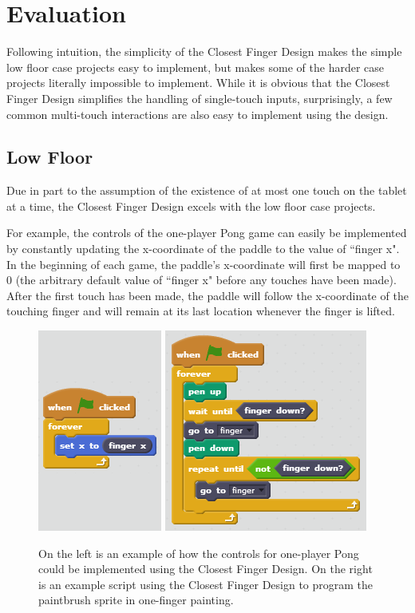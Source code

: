 \section{Evaluation}
Following intuition, the simplicity of the Closest Finger Design makes the simple low floor case projects easy to implement, but makes some of the harder case projects literally impossible to implement. While it is obvious that the Closest Finger Design simplifies the handling of single-touch inputs, surprisingly, a few common multi-touch interactions are also easy to implement using the design.

\subsection{Low Floor}
Due in part to the assumption of the existence of at most one touch on the tablet at a time, the Closest Finger Design excels with the low floor case projects. 

For example, the controls of the one-player Pong game can easily be implemented by constantly updating the x-coordinate of the paddle to the value of ``finger x". In the beginning of each game, the paddle's x-coordinate will first be mapped to $0$ (the arbitrary default value of ``finger x" before any touches have been made). After the first touch has been made, the paddle will follow the x-coordinate of the touching finger and will remain at its last location whenever the finger is lifted.

\begin{figure}
\centering
\includegraphics{images/OnePlayerPongCFD.PNG}
\includegraphics{images/OneFingerPaintingCFD.PNG}
\caption{On the left is an example of how the controls for one-player Pong could be implemented using the Closest Finger Design. On the right is an example script using the Closest Finger Design to program the paintbrush sprite in one-finger painting.}
\end{figure}


